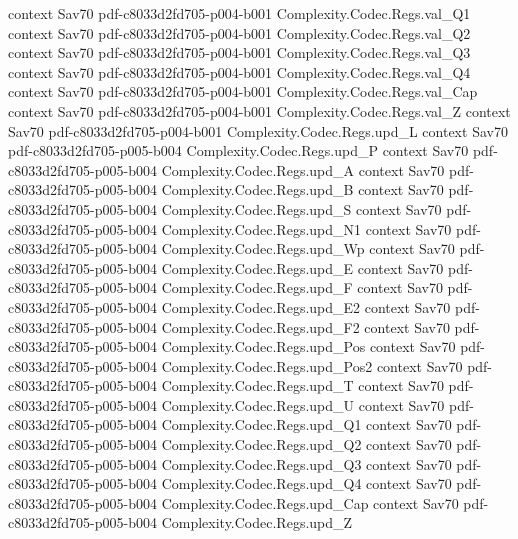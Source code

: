 \begin{theorem}
  {context}
  {Sav70}
  {pdf-c8033d2fd705-p004-b001}
\proofstep
  {Complexity.Codec.Regs.val_Q1}
  {context}
  {Sav70}
  {pdf-c8033d2fd705-p004-b001}
\proofstep
  {Complexity.Codec.Regs.val_Q2}
  {context}
  {Sav70}
  {pdf-c8033d2fd705-p004-b001}
\proofstep
  {Complexity.Codec.Regs.val_Q3}
  {context}
  {Sav70}
  {pdf-c8033d2fd705-p004-b001}
\proofstep
  {Complexity.Codec.Regs.val_Q4}
  {context}
  {Sav70}
  {pdf-c8033d2fd705-p004-b001}
\proofstep
  {Complexity.Codec.Regs.val_Cap}
  {context}
  {Sav70}
  {pdf-c8033d2fd705-p004-b001}
\proofstep
  {Complexity.Codec.Regs.val_Z}
  {context}
  {Sav70}
  {pdf-c8033d2fd705-p004-b001}
\proofstep
  {Complexity.Codec.Regs.upd_L}
  {context}
  {Sav70}
  {pdf-c8033d2fd705-p005-b004}
\proofstep
  {Complexity.Codec.Regs.upd_P}
  {context}
  {Sav70}
  {pdf-c8033d2fd705-p005-b004}
\proofstep
  {Complexity.Codec.Regs.upd_A}
  {context}
  {Sav70}
  {pdf-c8033d2fd705-p005-b004}
\proofstep
  {Complexity.Codec.Regs.upd_B}
  {context}
  {Sav70}
  {pdf-c8033d2fd705-p005-b004}
\proofstep
  {Complexity.Codec.Regs.upd_S}
  {context}
  {Sav70}
  {pdf-c8033d2fd705-p005-b004}
\proofstep
  {Complexity.Codec.Regs.upd_N1}
  {context}
  {Sav70}
  {pdf-c8033d2fd705-p005-b004}
\proofstep
  {Complexity.Codec.Regs.upd_Wp}
  {context}
  {Sav70}
  {pdf-c8033d2fd705-p005-b004}
\proofstep
  {Complexity.Codec.Regs.upd_E}
  {context}
  {Sav70}
  {pdf-c8033d2fd705-p005-b004}
\proofstep
  {Complexity.Codec.Regs.upd_F}
  {context}
  {Sav70}
  {pdf-c8033d2fd705-p005-b004}
\proofstep
  {Complexity.Codec.Regs.upd_E2}
  {context}
  {Sav70}
  {pdf-c8033d2fd705-p005-b004}
\proofstep
  {Complexity.Codec.Regs.upd_F2}
  {context}
  {Sav70}
  {pdf-c8033d2fd705-p005-b004}
\proofstep
  {Complexity.Codec.Regs.upd_Pos}
  {context}
  {Sav70}
  {pdf-c8033d2fd705-p005-b004}
\proofstep
  {Complexity.Codec.Regs.upd_Pos2}
  {context}
  {Sav70}
  {pdf-c8033d2fd705-p005-b004}
\proofstep
  {Complexity.Codec.Regs.upd_T}
  {context}
  {Sav70}
  {pdf-c8033d2fd705-p005-b004}
\proofstep
  {Complexity.Codec.Regs.upd_U}
  {context}
  {Sav70}
  {pdf-c8033d2fd705-p005-b004}
\proofstep
  {Complexity.Codec.Regs.upd_Q1}
  {context}
  {Sav70}
  {pdf-c8033d2fd705-p005-b004}
\proofstep
  {Complexity.Codec.Regs.upd_Q2}
  {context}
  {Sav70}
  {pdf-c8033d2fd705-p005-b004}
\proofstep
  {Complexity.Codec.Regs.upd_Q3}
  {context}
  {Sav70}
  {pdf-c8033d2fd705-p005-b004}
\proofstep
  {Complexity.Codec.Regs.upd_Q4}
  {context}
  {Sav70}
  {pdf-c8033d2fd705-p005-b004}
\proofstep
  {Complexity.Codec.Regs.upd_Cap}
  {context}
  {Sav70}
  {pdf-c8033d2fd705-p005-b004}
\proofstep
  {Complexity.Codec.Regs.upd_Z}

\end{theorem}
